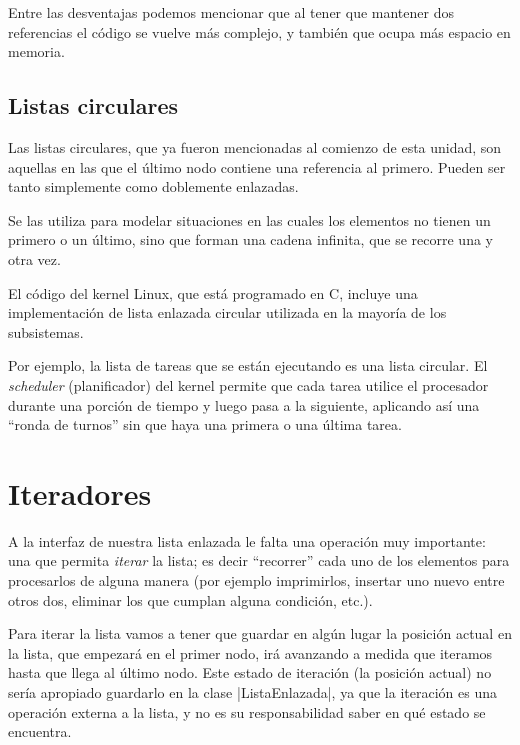 Entre las desventajas podemos mencionar que al tener que mantener dos
referencias el código se vuelve más complejo, y también que ocupa más
espacio en memoria.

\subsection*{Listas circulares}

Las listas circulares, que ya fueron mencionadas al comienzo de esta
unidad, son aquellas en las que el último nodo contiene una referencia al
primero.  Pueden ser tanto simplemente como doblemente enlazadas.

Se las utiliza para modelar situaciones en las cuales los elementos no
tienen un primero o un último, sino que forman una cadena infinita, que se
recorre una y otra vez.

\begin{sabias_que}
El código del kernel Linux, que está programado en C, incluye una
implementación de lista enlazada circular utilizada en la mayoría de los
subsistemas.

Por ejemplo, la lista de tareas que se están ejecutando es una lista
circular.  El \emph{scheduler} (planificador) del kernel permite que cada tarea
utilice el procesador durante una porción de tiempo y luego pasa a la
siguiente, aplicando así una \enquote{ronda de turnos} sin que haya una primera o una
última tarea.
\end{sabias_que}

\section{Iteradores}

A la interfaz de nuestra lista enlazada le falta una operación muy importante:
una que permita \emph{iterar} la lista; es decir \enquote{recorrer} cada uno de los
elementos para procesarlos de alguna manera (por ejemplo imprimirlos, insertar
uno nuevo entre otros dos, eliminar los que cumplan alguna condición, etc.).

Para iterar la lista vamos a tener que guardar en algún lugar la posición
actual en la lista, que empezará en el primer nodo, irá avanzando a medida que
iteramos hasta que llega al último nodo. Este estado de iteración (la posición
actual) no sería apropiado guardarlo en la clase |ListaEnlazada|, ya que la
iteración es una operación externa a la lista, y no es su responsabilidad saber
en qué estado se encuentra.

